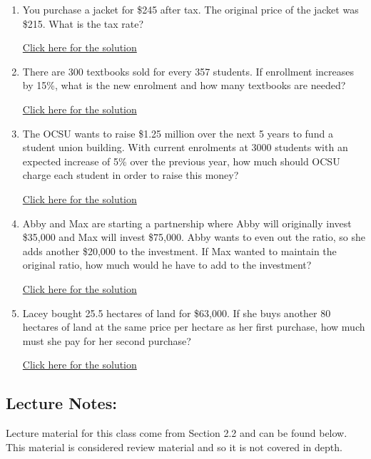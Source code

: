 \documentclass[
]{book}
\providecommand{\tightlist}{%
  \setlength{\itemsep}{0pt}\setlength{\parskip}{0pt}}
\begin{document}
\begin{enumerate}
\def\labelenumi{\arabic{enumi}.}
\tightlist
\item
  You purchase a jacket for \$245 after tax. The original price of the jacket was \$215. What is the tax rate?

  \href{https://youtu.be/YnkjwUr_YFQ}{Click here for the solution}
\item
  There are 300 textbooks sold for every 357 students. If enrollment increases by 15\%, what is the new enrolment and how many textbooks are needed?

  \href{https://youtu.be/clGY-9mrAFU}{Click here for the solution}
\item
  The OCSU wants to raise \$1.25 million over the next 5 years to fund a student union building. With current enrolments at 3000 students with an expected increase of 5\% over the previous year, how much should OCSU charge each student in order to raise this money?

  \href{https://youtu.be/Aum_ZyukTHM}{Click here for the solution}
\item
  Abby and Max are starting a partnership where Abby will originally invest \$35,000 and Max will invest \$75,000. Abby wants to even out the ratio, so she adds another \$20,000 to the investment. If Max wanted to maintain the original ratio, how much would he have to add to the investment?

  \href{https://youtu.be/vrGvTSZJ8uI}{Click here for the solution}
\item
  Lacey bought 25.5 hectares of land for \$63,000. If she buys another 80 hectares of land at the same price per hectare as her first purchase, how much must she pay for her second purchase?

  \href{https://youtu.be/PSSyIpvduZs}{Click here for the solution}
\end{enumerate}

\subsection*{Lecture Notes:}\label{lecture-notes-2}

Lecture material for this class come from Section 2.2 and can be found below. This material is considered review material and so it is not covered in depth.
\end{document}
